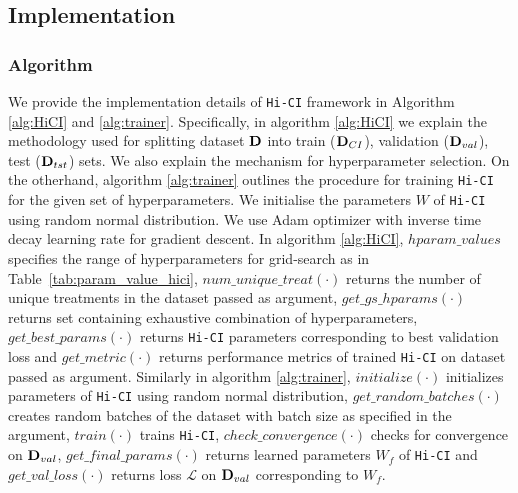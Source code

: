 \documentclass[twoside,11pt]{article}
\begin{document}
\subsection{Implementation}

\subsubsection{Algorithm}
We provide the implementation details of \texttt{Hi-CI} framework in Algorithm \ref{alg:HiCI} and \ref{alg:trainer}. Specifically, in algorithm \ref{alg:HiCI} we explain the methodology used for splitting dataset $\mathbf{D}$ into train ($\mathbf{D}_{CI}$), validation ($\mathbf{D}_{val}$), test ($\mathbf{D}_{tst}$) sets. We also explain the mechanism for hyperparameter selection. On the otherhand, algorithm \ref{alg:trainer} outlines the procedure for training \texttt{Hi-CI} for the given set of hyperparameters. We initialise the parameters $W$ of \texttt{Hi-CI} using random normal distribution. We use Adam optimizer with inverse time decay learning rate for gradient descent. In algorithm \ref{alg:HiCI},  $hparam\_values$ specifies the range of hyperparameters for grid-search as in Table~\ref{tab:param_value_hici}, $num\_unique\_treat(\cdot)$ returns the number of unique treatments in the dataset passed as argument, $get\_gs\_hparams(\cdot)$ returns set containing exhaustive combination of hyperparameters,  $get\_best\_params(\cdot)$ returns \texttt{Hi-CI} parameters corresponding to best validation loss and $get\_metric(\cdot)$  returns performance metrics of trained \texttt{Hi-CI} on dataset passed as argument. Similarly in algorithm \ref{alg:trainer}, $initialize(\cdot)$ initializes parameters of \texttt{Hi-CI} using random normal distribution,  $get\_random\_batches(\cdot)$ creates random batches of the dataset with batch size as specified in the argument, $train(\cdot)$ trains \texttt{Hi-CI}, $check\_convergence(\cdot)$ checks for convergence on $\mathbf{D}_{val}$, 
$get\_final\_params(\cdot)$ returns learned parameters $W_f$ of \texttt{Hi-CI} and $get\_val\_loss(\cdot)$ returns loss $\mathcal{L}$ on $\mathbf{D}_{val}$ corresponding to $W_f$.

\end{document}
